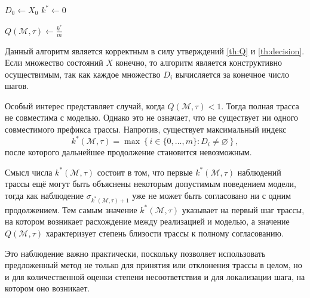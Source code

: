 \begin{algorithm}[htp!]
    \SetAlgoLined

    $D_0 \gets X_0$\;
    $k^* \gets 0$\;


    $Q(\mathcal{M},\tau) \gets \frac{k^*}{m}$\;

    \;
    \caption{Нахождение максимального согласованного префикса трассы}
    \label{alg:trace-quality}
\end{algorithm}

Данный алгоритм является корректным в силу утверждений \ref{th:Q} и
\ref{th:decision}. Если множество состояний $X$ конечно, то алгоритм является
конструктивно осуществимым, так как каждое множество $D_i$ вычисляется за
конечное число шагов.

Особый интерес представляет случай, когда $Q(\mathcal{M},\tau) < 1$. Тогда
полная трасса не совместима с моделью. Однако это не означает, что не
существует ни одного совместимого префикса трассы. Напротив, существует
максимальный индекс
\[
k^*(\mathcal{M},\tau)
=
\max
\left\{
i \in \{0,\dots,m\} : D_i \neq \varnothing
\right\},
\]
после которого дальнейшее продолжение становится невозможным.

Смысл числа $k^*(\mathcal{M},\tau)$ состоит в том, что первые
$k^*(\mathcal{M},\tau)$ наблюдений трассы ещё могут быть объяснены некоторым
допустимым поведением модели, тогда как наблюдение
$\sigma_{k^*(\mathcal{M},\tau)+1}$ уже не может быть согласовано ни с одним
продолжением. Тем самым значение $k^*(\mathcal{M},\tau)$ указывает на первый
шаг трассы, на котором возникает расхождение между реализацией и моделью, а
значение $Q(\mathcal{M},\tau)$ характеризует степень близости трассы к полному
согласованию.

Это наблюдение важно практически, поскольку позволяет использовать предложенный
метод не только для принятия или отклонения трассы в целом, но и для
количественной оценки степени несоответствия и для локализации шага, на котором
оно возникает.
